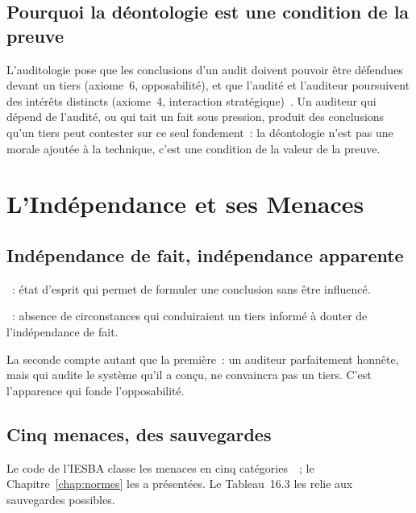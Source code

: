 \subsection{Pourquoi la déontologie est une condition de la preuve}

L'auditologie pose que les conclusions d'un audit doivent pouvoir être
défendues devant un tiers (axiome~6, opposabilité), et que l'audité et
l'auditeur poursuivent des intérêts distincts (axiome~4, interaction
stratégique)~\cite{minka2026auditologie}. Un auditeur qui dépend de
l'audité, ou qui tait un fait sous pression, produit des conclusions qu'un
tiers peut contester sur ce seul fondement~: la déontologie n'est pas une
morale ajoutée à la technique, c'est une condition de la valeur de la
preuve.

\section{L'Indépendance et ses Menaces}
\label{sec:c16-menaces}

\subsection{Indépendance de fait, indépendance apparente}

\begin{boxdef}
~: état d'esprit qui
permet de formuler une conclusion sans être influencé.

\medskip
{}~: absence de circonstances qui
conduiraient un tiers informé à douter de l'indépendance de fait.
\end{boxdef}

La seconde compte autant que la première~: un auditeur parfaitement
honnête, mais qui audite le système qu'il a conçu, ne convaincra pas un
tiers. C'est l'apparence qui fonde l'opposabilité.

\subsection{Cinq menaces, des sauvegardes}

Le code de l'IESBA classe les menaces en cinq catégories~\cite{iesba2018code}~;
le Chapitre~\ref{chap:normes} les a présentées. Le Tableau~16.3 les relie
aux sauvegardes possibles.

